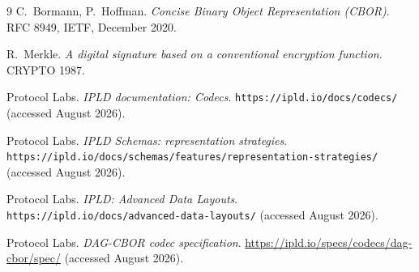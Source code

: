 \documentclass[11pt]{article}
\theoremstyle{definition}
\begin{document}
\begin{thebibliography}{9}
 C.~Bormann, P.~Hoffman.
\emph{Concise Binary Object Representation (CBOR)}. RFC 8949, IETF, December 2020.

 R.~Merkle.
\emph{A digital signature based on a conventional encryption function}.
CRYPTO 1987.

 Protocol Labs.
\emph{IPLD documentation: Codecs}. \texttt{https://ipld.io/docs/codecs/}
(accessed August 2026).

 Protocol Labs.
\emph{IPLD Schemas: representation strategies}.
\texttt{https://ipld.io/docs/schemas/features/representation-strategies/}
(accessed August 2026).

 Protocol Labs.
\emph{IPLD: Advanced Data Layouts}.
\texttt{https://ipld.io/docs/advanced-data-layouts/} (accessed August 2026).

 Protocol Labs.
\emph{DAG-CBOR codec specification}.
\url{https://ipld.io/specs/codecs/dag-cbor/spec/} (accessed August 2026).

\end{thebibliography}
\end{document}
